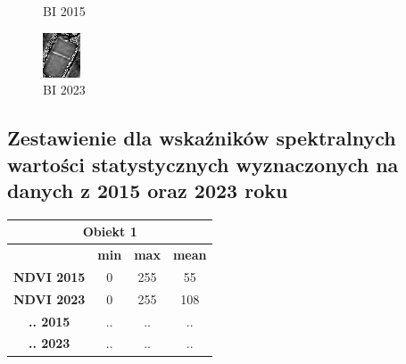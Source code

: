\documentclass[a4paper,12pt]{article}  %
\begin{document}
\begin{figure}[H]
\begin{minipage}{0.24\textwidth}
        \caption*{BI 2015}
    \end{minipage}
    \begin{minipage}{0.24\textwidth}
        \centering
        \includegraphics[width=\linewidth]{spektralne/bi_budynek3_2023.png}
        \caption*{BI 2023}
    \end{minipage}
\end{figure}

\newpage
\subsection{Zestawienie dla wskaźników spektralnych wartości statystycznych wyznaczonych na danych z 2015 oraz 2023 roku}

\begin{table}[h!]
    \centering
    \begin{tabular}{|c|c|c|c|}
    \hline
    \multicolumn{4}{|c|}{\textbf{Obiekt 1}} \\ \hline
    \textbf{} & \textbf{min} & \textbf{max} & \textbf{mean} \\ \hline
    \textbf{NDVI 2015} & 0 & 255 & 55\\ \hline
    \textbf{NDVI 2023} & 0 & 255 & 108\\ \hline
    \textbf{.. 2015} & .. & .. & ..\\ \hline
    \textbf{.. 2023} & .. & .. & ..\\ \hline
    \end{tabular}
\end{table}
\end{document}
